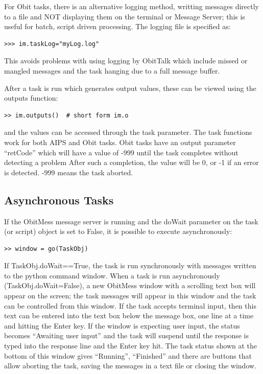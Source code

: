 \documentclass[11pt]{report}
\begin{document}
For Obit tasks, there is an alternative logging method, writting
messages directly to a file and NOT displaying them on the terminal or
Message Server; this is useful for batch, script driven processing.
The logging file is specified as:
\begin{verbatim}
>>> im.taskLog="myLog.log"
\end{verbatim}
This avoids problems with using logging by ObitTalk which include
missed or mangled messages and the task hanging due to a full message
buffer.

After a task is run which generates output values, these can be
viewed using the outputs function:
\begin{verbatim}
>> im.outputs()  # short form im.o
\end{verbatim}
and the values can be accessed through the task parameter.
The task functions work for both AIPS and Obit tasks.
Obit tasks have an output parameter ``retCode'' which will have a 
value of -999 until the task completes without detecting a problem
After such a completion, the value will be 0, or -1 if an error is
detected.
-999 means the task aborted.

\subsection{Asynchronous Tasks \label{asynctasks}}
If the ObitMess message server is running and the doWait
parameter on the task (or script) object is set to False, it is
possible to execute asynchronously:
\begin{verbatim}
>> window = go(TaskObj)
\end{verbatim}
If TaskObj.doWait==True, the task is run synchronously with messages
written to the python command window.
When a task is run asynchronously (TaskObj.doWait=False),  a new
ObitMess window with a scrolling text box will appear on the screen;
the task messages will appear in this window and the task can be
controlled from this window. 
If the task accepts terminal input, then this text can be entered into
the text box below the message box, one line at a time and
hitting the Enter key.
If the window is expecting user input, the status becomes ``Awaiting
user input'' and the task will suspend until the response is typed
into the response line and the Enter key hit.
The task status shown at the bottom of this window gives  ``Running'',
``Finished'' and there are buttons that allow aborting the task, saving
the messages in a text file or closing the window.
\end{document}
